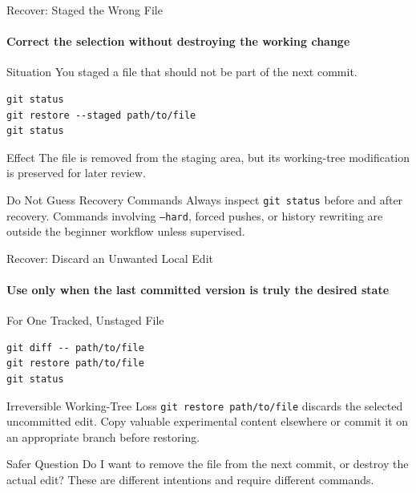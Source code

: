 \begin{frame}[fragile]{Recover: Staged the Wrong File}
\framesubtitle{Correct the selection without destroying the working change}
\footnotesize
\begin{exampleblock}{Situation}
You staged a file that should not be part of the next commit.
\begin{verbatim}
git status
git restore --staged path/to/file
git status
\end{verbatim}
\end{exampleblock}
\begin{block}{Effect}
The file is removed from the staging area, but its working-tree modification is preserved for later review.
\end{block}
\begin{alertblock}{Do Not Guess Recovery Commands}
Always inspect \texttt{git status} before and after recovery. Commands involving \texttt{--hard}, forced pushes, or history rewriting are outside the beginner workflow unless supervised.
\end{alertblock}
\end{frame}

\begin{frame}[fragile]{Recover: Discard an Unwanted Local Edit}
\framesubtitle{Use only when the last committed version is truly the desired state}
\footnotesize
\begin{exampleblock}{For One Tracked, Unstaged File}
\begin{verbatim}
git diff -- path/to/file
git restore path/to/file
git status
\end{verbatim}
\end{exampleblock}
\begin{alertblock}{Irreversible Working-Tree Loss}
\texttt{git restore path/to/file} discards the selected uncommitted edit. Copy valuable experimental content elsewhere or commit it on an appropriate branch before restoring.
\end{alertblock}
\begin{block}{Safer Question}
Do I want to remove the file from the next commit, or destroy the actual edit? These are different intentions and require different commands.
\end{block}
\end{frame}


